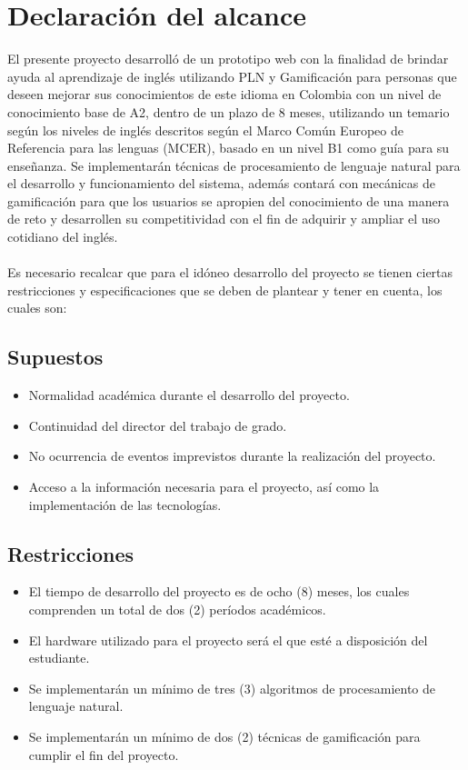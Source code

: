 \section{Declaración del alcance}

El presente proyecto desarrolló de un prototipo web con la finalidad de brindar ayuda al aprendizaje de inglés utilizando PLN y Gamificación para personas que deseen mejorar sus conocimientos de este idioma en Colombia con un nivel de conocimiento base de A2, dentro de un plazo de 8 meses, utilizando un temario según los niveles de inglés descritos según el Marco Común Europeo de Referencia para las lenguas (MCER), basado en un nivel B1 \cite{mcer2002} como guía para su enseñanza. Se implementarán técnicas de procesamiento de lenguaje natural para el desarrollo y funcionamiento del sistema, además contará con mecánicas de gamificación para que los usuarios se apropien del conocimiento de una manera de reto y desarrollen su competitividad con el fin de adquirir y ampliar el uso cotidiano del inglés.
\\
\\
Es necesario recalcar que para el idóneo desarrollo del proyecto se tienen ciertas restricciones y especificaciones que se deben de plantear y tener en cuenta, los cuales son:

\subsection{Supuestos}

\begin{itemize}
    \item Normalidad académica durante el desarrollo del proyecto.
    \item Continuidad del director del trabajo de grado.
    \item No ocurrencia de eventos imprevistos durante la realización del proyecto.
    \item Acceso a la información necesaria para el proyecto, así como la implementación de las tecnologías.
\end{itemize}
\subsection{Restricciones}

\begin{itemize}
    \item El tiempo de desarrollo del proyecto es de ocho (8) meses, los cuales comprenden un total de dos (2) períodos académicos.
    \item El hardware utilizado para el proyecto será el que esté a disposición del estudiante.
    \item Se implementarán un mínimo de tres (3) algoritmos de procesamiento de lenguaje natural.
    \item Se implementarán un mínimo de dos (2) técnicas de gamificación para cumplir el fin del proyecto.
\end{itemize}
\vfill

